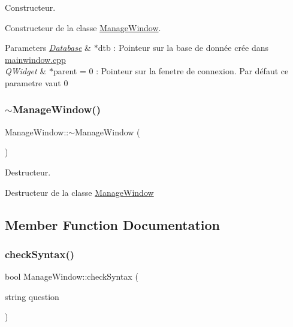 Constructeur. 

Constructeur de la classe \mbox{\hyperlink{classManageWindow}{Manage\+Window}}.


\begin{DoxyParams}{Parameters}
{\em \mbox{\hyperlink{classDatabase}{Database}}} & $\ast$dtb \+: Pointeur sur la base de donnée crée dans \mbox{\hyperlink{mainwindow_8cpp}{mainwindow.\+cpp}} \\
\hline
{\em Q\+Widget} & $\ast$parent = 0 \+: Pointeur sur la fenetre de connexion. Par défaut ce parametre vaut 0 \\
\hline
\end{DoxyParams}
\mbox{\label{classManageWindow_a7ce02d4018de7f914756c13aa5b965fd}} 
\subsubsection{\texorpdfstring{$\sim$\+Manage\+Window()}{~ManageWindow()}}
{\footnotesize\ttfamily Manage\+Window\+::$\sim$\+Manage\+Window (\begin{DoxyParamCaption}{ }\end{DoxyParamCaption})}



Destructeur. 

Destructeur de la classe \mbox{\hyperlink{classManageWindow}{Manage\+Window}} 

\subsection{Member Function Documentation}
\mbox{\label{classManageWindow_aac50125bb2e62a8e9905c4c5a09c6184}} 
\subsubsection{\texorpdfstring{check\+Syntax()}{checkSyntax()}}
{\footnotesize\ttfamily bool Manage\+Window\+::check\+Syntax (\begin{DoxyParamCaption}\item[{string}]{question }\end{DoxyParamCaption})}



